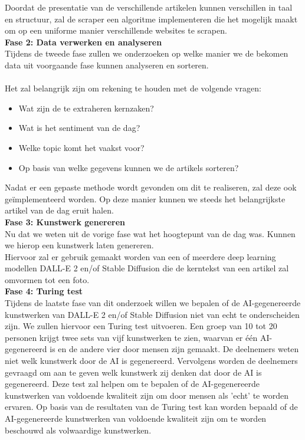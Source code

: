 \noindent
Doordat de presentatie van de verschillende artikelen kunnen verschillen in taal en structuur, zal de scraper een algoritme implementeren die het mogelijk maakt om op een uniforme manier verschillende websites te scrapen. \\

\noindent
\textbf{Fase 2: Data verwerken en analyseren} \\
Tijdens de tweede fase zullen we onderzoeken op welke manier we de bekomen data uit voorgaande fase kunnen analyseren en sorteren. \\ \\
\noindent
Het zal belangrijk zijn om rekening te houden met de volgende vragen: 
\begin{itemize}
    \item Wat zijn de te extraheren kernzaken?
    \item Wat is het sentiment van de dag? 
    \item Welke topic komt het vaakst voor?
    \item Op basis van welke gegevens kunnen we de artikels sorteren? 
\end{itemize}

\noindent
Nadat er een gepaste methode wordt gevonden om dit te realiseren, zal deze ook geïmplementeerd worden. Op deze manier kunnen we steeds het belangrijkste artikel van de dag eruit halen. \\

\noindent
\textbf{Fase 3: Kunstwerk genereren} \\
Nu dat we weten uit de vorige fase wat het hoogtepunt van de dag was. Kunnen we hierop een kunstwerk laten genereren. \\
Hiervoor zal er gebruik gemaakt worden van een of meerdere deep learning modellen DALL-E 2 en/of Stable Diffusion die de kerntekst van een artikel zal omvormen tot een foto. \\

\noindent
\textbf{Fase 4: Turing test} \\ 
Tijdens de laatste fase van dit onderzoek willen we bepalen of de AI-gegenereerde kunstwerken van DALL-E 2 en/of Stable Diffusion niet van echt te onderscheiden zijn. We zullen hiervoor een Turing test uitvoeren. Een groep van 10 tot 20 personen krijgt twee sets van vijf kunstwerken te zien, waarvan er één AI-gegenereerd is en de andere vier door mensen zijn gemaakt. De deelnemers weten niet welk kunstwerk door de AI is gegenereerd. Vervolgens worden de deelnemers gevraagd om aan te geven welk kunstwerk zij denken dat door de AI is gegenereerd. Deze test zal helpen om te bepalen of de AI-gegenereerde kunstwerken van voldoende kwaliteit zijn om door mensen als 'echt' te worden ervaren. Op basis van de resultaten van de Turing test kan worden bepaald of de AI-gegenereerde kunstwerken van voldoende kwaliteit zijn om te worden beschouwd als volwaardige kunstwerken.

